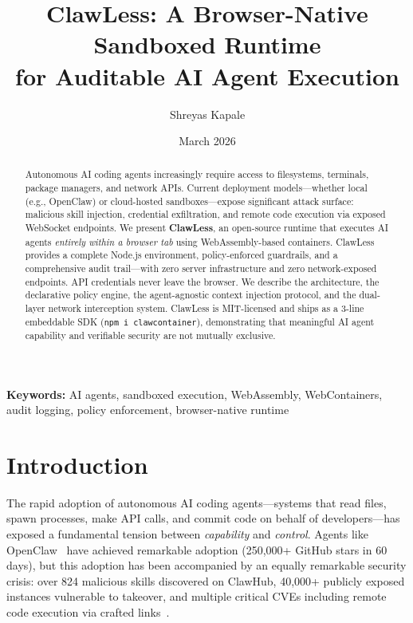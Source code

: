 \documentclass[11pt,twocolumn]{article}
\title{
  \textbf{ClawLess: A Browser-Native Sandboxed Runtime\\for Auditable AI Agent Execution}
}
\author[1]{Shreyas Kapale}
\affil[1]{Lyzr AI\\ \texttt{shreyas@lyzr.ai}}
\date{March 2026}
\begin{document}
\maketitle

\begin{abstract}
Autonomous AI coding agents increasingly require access to filesystems, terminals, package managers, and network APIs. Current deployment models---whether local (e.g., OpenClaw) or cloud-hosted sandboxes---expose significant attack surface: malicious skill injection, credential exfiltration, and remote code execution via exposed WebSocket endpoints. We present \textbf{ClawLess}, an open-source runtime that executes AI agents \emph{entirely within a browser tab} using WebAssembly-based containers. ClawLess provides a complete Node.js environment, policy-enforced guardrails, and a comprehensive audit trail---with zero server infrastructure and zero network-exposed endpoints. API credentials never leave the browser. We describe the architecture, the declarative policy engine, the agent-agnostic context injection protocol, and the dual-layer network interception system. ClawLess is MIT-licensed and ships as a 3-line embeddable SDK (\texttt{npm i clawcontainer}), demonstrating that meaningful AI agent capability and verifiable security are not mutually exclusive.
\end{abstract}

\textbf{Keywords:} AI agents, sandboxed execution, WebAssembly, WebContainers, audit logging, policy enforcement, browser-native runtime

\section{Introduction}
\label{sec:intro}

The rapid adoption of autonomous AI coding agents---systems that read files, spawn processes, make API calls, and commit code on behalf of developers---has exposed a fundamental tension between \emph{capability} and \emph{control}. Agents like OpenClaw~\cite{openclaw2026} have achieved remarkable adoption (250,000+ GitHub stars in 60 days), but this adoption has been accompanied by an equally remarkable security crisis: over 824 malicious skills discovered on ClawHub, 40,000+ publicly exposed instances vulnerable to takeover, and multiple critical CVEs including remote code execution via crafted links~\cite{clawjacked2026,thehackernews2026}.
\end{document}
